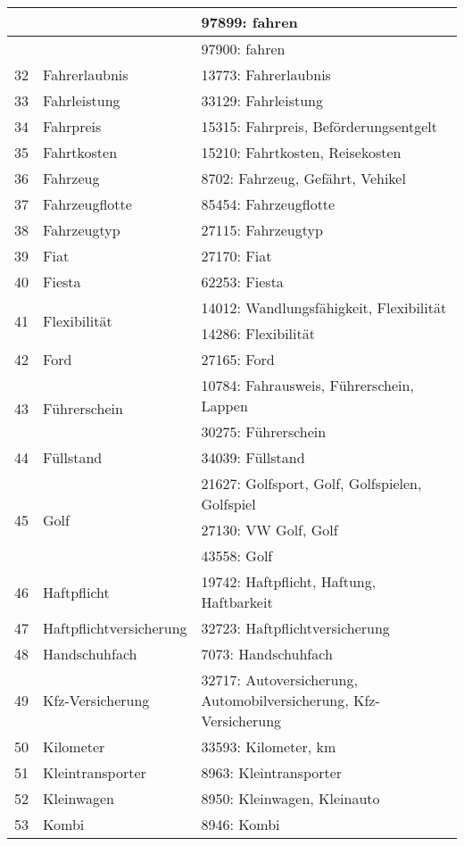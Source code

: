 \begin{longtable}{|m{1cm}|m{4.5cm}|m{7.5cm}|}
	\hline
	& & 97899: fahren\\
	\hline
	& & 97900: fahren\\
	\hline
	32 & Fahrerlaubnis & 13773: Fahrerlaubnis\\
	\hline
	33 & Fahrleistung & 33129: Fahrleistung\\
	\hline
	34 & Fahrpreis & 15315: Fahrpreis, Beförderungsentgelt\\
	\hline
	35 & Fahrtkosten & 15210: Fahrtkosten, Reisekosten\\
	\hline
	36 & Fahrzeug & 8702: Fahrzeug, Gefährt, Vehikel\\
	\hline
	37 & Fahrzeugflotte & 85454: Fahrzeugflotte\\
	\hline
	38 & Fahrzeugtyp & 27115: Fahrzeugtyp\\
	\hline
	39 & Fiat & 27170: Fiat\\
	\hline
	40 & Fiesta & 62253: Fiesta\\
	\hline
	\multirow{2}{*}{41} & \multirow{2}{*}{Flexibilität} & 14012: Wandlungsfähigkeit, Flexibilität\\
	& & 14286: Flexibilität\\
	\hline
	42 & Ford & 27165: Ford\\
	\hline
	\multirow{2}{*}{43} & \multirow{2}{*}{Führerschein} & 10784: Fahrausweis, Führerschein, Lappen\\
	& & 30275: Führerschein\\
	\hline
	44 & Füllstand & 34039: Füllstand\\
	\hline
	\multirow{3}{*}{45} & \multirow{3}{*}{Golf} & 21627: Golfsport, Golf, Golfspielen, Golfspiel\\
	& & 27130: VW Golf, Golf\\
	\hline
	& & 43558: Golf\\
	\hline
	46 & Haftpflicht & 19742: Haftpflicht, Haftung, Haftbarkeit\\
	\hline
	47 & Haftpflichtversicherung & 32723: Haftpflichtversicherung\\
	\hline
	48 & Handschuhfach & 7073: Handschuhfach\\
	\hline
	49 & Kfz-Versicherung & 32717: Autoversicherung, Automobilversicherung, Kfz-Versicherung\\
	\hline
	50 & Kilometer & 33593: Kilometer, km\\
	\hline
	51 & Kleintransporter & 8963: Kleintransporter\\
	\hline
	52 & Kleinwagen & 8950: Kleinwagen, Kleinauto\\
	\hline
	53 & Kombi & 8946: Kombi\\

\end{longtable}
